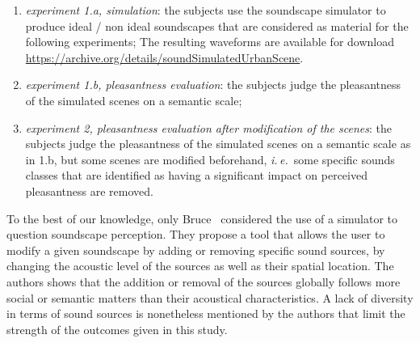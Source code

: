 \documentclass[12pt]{elsarticle}
\newcommand{\ie}{\emph{i.\,e.}}
\newcommand{\al}{\emph{et~al.}}
\begin{document}
\begin{enumerate}
\item \emph{experiment 1.a, simulation}:  the subjects use the soundscape simulator to produce ideal / non ideal soundscapes that are considered as material for the following experiments; The resulting waveforms are available for download \url{https://archive.org/details/soundSimulatedUrbanScene}.
\item \emph{experiment 1.b, pleasantness evaluation}: the subjects judge the pleasantness of the simulated scenes on a semantic scale;
\item \emph{experiment 2, pleasantness evaluation after modification of the scenes}: the subjects judge the pleasantness of the simulated scenes on a semantic scale as in 1.b, but some scenes are modified beforehand, \ie~some specific sounds classes that are identified as having a significant impact on perceived pleasantness are removed.
\end{enumerate}


To the best of our knowledge, only Bruce~\cite{bruce2009development,bruce2014effects} considered the use of a simulator to question soundscape perception. They propose a tool that allows the user to modify a given soundscape by adding or removing specific sound sources, by changing the acoustic level of the sources as well as their spatial location. The authors shows that the addition or removal of the sources globally follows more social or semantic matters than their acoustical characteristics. A lack of diversity in terms of sound sources is nonetheless mentioned by the authors that limit the strength of the outcomes given in this study.

\end{document}
